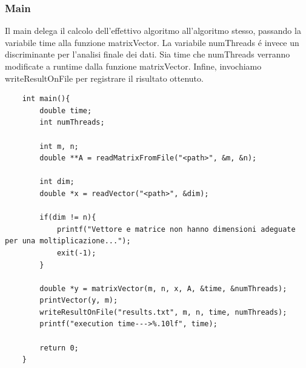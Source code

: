 \subsubsection{Main}
Il main delega il calcolo dell'effettivo algoritmo all'algoritmo stesso, passando la variabile time alla funzione matrixVector.
La variabile numThreads é invece un discriminante per l'analisi finale dei dati.
Sia time che numThreads verranno modificate a runtime dalla funzione matrixVector.
Infine, invochiamo writeResultOnFile per registrare il risultato ottenuto.
\begin{lstlisting}
    int main(){
        double time;
        int numThreads;

        int m, n;
        double **A = readMatrixFromFile("<path>", &m, &n);
    
        int dim;
        double *x = readVector("<path>", &dim);
    
        if(dim != n){
            printf("Vettore e matrice non hanno dimensioni adeguate per una moltiplicazione...");
            exit(-1);
        }
        
        double *y = matrixVector(m, n, x, A, &time, &numThreads);
        printVector(y, m);
        writeResultOnFile("results.txt", m, n, time, numThreads);
        printf("execution time--->%.10lf", time);
    
        return 0;
    }
\end{lstlisting}

